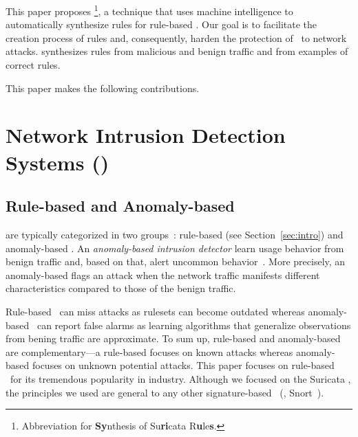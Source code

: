\documentclass[sigconf,review, anonymous]{acmart}
\begin{document}
This paper proposes \tname{}\footnote{Abbreviation for
  \textbf{Sy}nthesis of Su\textbf{ri}cata R\textbf{u}le\textbf{s}.}, a
technique that uses machine intelligence to automatically synthesize
rules for rule-based \nids. Our goal is to facilitate the creation
process of rules and, consequently, harden the protection of \nids\ to
network attacks. \tname{} synthesizes rules from malicious and benign
traffic and from examples of correct rules.




This paper makes the following contributions.

\section{Network Intrusion Detection Systems (\nids)}
\label{sec:background}

\subsection{Rule-based and Anomaly-based \nids}

\sloppy \nids{} are typically categorized in two
groups~\cite{kumar2007survey}: rule-based (see
Section~\ref{sec:intro}) and anomaly-based \nids. An
\emph{anomaly-based intrusion detector} learn usage behavior from
benign traffic and, based on that, alert uncommon
behavior~\cite{7579764,kumar2007survey,Mitchell:2014:SID:2597757.2542049,cordy-etal-issta19}. More
precisely, an anomaly-based \nids{} flags an attack when the network
traffic manifests different characteristics compared to those of the
benign traffic.

Rule-based \nids\ can miss attacks as rulesets can become outdated
whereas anomaly-based \nids\ can report false alarms as learning
algorithms that generalize observations from bening traffic are
approximate. To sum up, rule-based \nids{} and anomaly-based \nids{}
are complementary---a rule-based \nids{} focuses on known attacks
whereas anomaly-based \nids{} focuses on unknown potential attacks.
This paper focuses on rule-based \nids\ for its tremendous popularity
in industry. Although we focused on the Suricata \nids, the principles
we used are general to any other signature-based \nids~(\eg{},
Snort~\cite{snort}).
\end{document}
